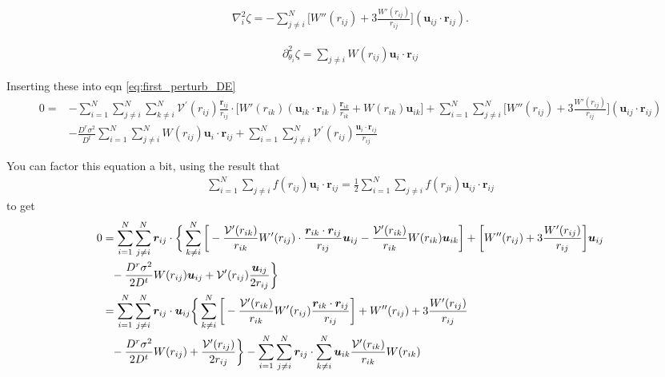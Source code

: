 \documentclass{article}
\begin{document}
\begin{align}
  \nabla_i^2\zeta=-\sum_{j\neq i}^N\bigg[W''(r_{ij})
  +3\frac{W'(r_{ij})}{r_{ij}}\bigg](\bm{u}_{ij}\cdot\bm{r}_{ij}).
\end{align}

\begin{align}
  \partial_{\theta_i}^2\zeta=\sum_{j\neq i}W(r_{ij})\bm{u}_i\cdot\bm{r}_{ij}
\end{align}

Inserting these into eqn \ref{eq:first_perturb_DE}
\begin{align}
  0=
  &-\sum_{i=1}^N\sum_{j\neq i}^N\sum_{k\neq i}^N
    \mathcal{V}^{\prime}(r_{ij})\frac{\bm{r}_{ij}}{r_{ij}}
    \cdot\bigg[W'(r_{ik})
    (\bm{u}_{ik}\cdot\bm{r}_{ik})\frac{\bm{r}_{ik}}{r_{ik}}
    +W(r_{ik})\bm{u}_{ik}\bigg]
    +\sum_{i=1}^N\sum_{j\neq i}^N\bigg[W''(r_{ij})
    +3\frac{W'(r_{ij})}{r_{ij}}\bigg](\bm{u}_{ij}\cdot\bm{r}_{ij})\nonumber\\
  &-\frac{D^r\sigma^2}{D^t}\sum_{i=1}^N\sum_{j\neq i}^NW(r_{ij})\bm{u}_i\cdot\bm{r}_{ij}
   +\sum_{i=1}^N\sum_{j\neq i}^N 
    \mathcal{V}^{\prime}(r_{ij})\frac{\bm{u}_i\cdot\bm{r}_{ij}}{r_{ij}}
\end{align}

You can factor this equation a bit, using the result that
\begin{align}
  \sum_{i=1}^N\sum_{j\neq i}f(r_{ij}) \bm{u}_i\cdot\bm{r}_{ij}
  =\frac{1}{2}\sum_{i=1}^N\sum_{j\neq i}f(r_{ji})\bm{u}_{ij}\cdot\bm{r}_{ij}
\end{align}
  to get
\begin{align}\label{eq:WODE_exact}
  0&=
     \sum_{i=1}^N\sum_{j\neq i}^N\bm{r}_{ij}\cdot\bigg\{\sum_{k\neq i}^N\bigg[
     -\frac{\mathcal{V}^{\prime}(r_{ik})}{r_{ik}}
     W'(r_{ij})
     \cdot\frac{\bm{r}_{ik}\cdot\bm{r}_{ij}}{r_{ij}}\bm{u}_{ij}
     -\frac{\mathcal{V}^{\prime}(r_{ik})}{r_{ik}}W(r_{ik})\bm{u}_{ik}\bigg]
     +\bigg[W''(r_{ij})
     +3\frac{W'(r_{ij})}{r_{ij}}\bigg]\bm{u}_{ij}\nonumber\\
   &\hphantom{=}-\frac{D^r\sigma^2}{2D^t}W(r_{ij})\bm{u}_{ij}
     +\mathcal{V}^{\prime}(r_{ij})\frac{\bm{u}_{ij}}{2r_{ij}}\bigg\}\nonumber\\
   &=\sum_{i=1}^N\sum_{j\neq i}^N\bm{r}_{ij}\cdot\bm{u}_{ij}
     \bigg\{\sum_{k\neq i}^N\bigg[
     -\frac{\mathcal{V}^{\prime}(r_{ik})}{r_{ik}}
     W'(r_{ij})\frac{\bm{r}_{ik}\cdot\bm{r}_{ij}}{r_{ij}}\bigg]
     +W''(r_{ij})+3\frac{W'(r_{ij})}{r_{ij}}\nonumber\\
   &\hphantom{=}-\frac{D^r\sigma^2}{2D^t}W(r_{ij})
     +\frac{\mathcal{V}^{\prime}(r_{ij})}{2r_{ij}}\bigg\}
     -\sum_{i=1}^N\sum_{j\neq i}^N\bm{r}_{ij}\cdot\sum_{k\neq i}^N
     \bm{u}_{ik}\frac{\mathcal{V}^{\prime}(r_{ik})}{r_{ik}}W(r_{ik})
\end{align}
\end{document}
